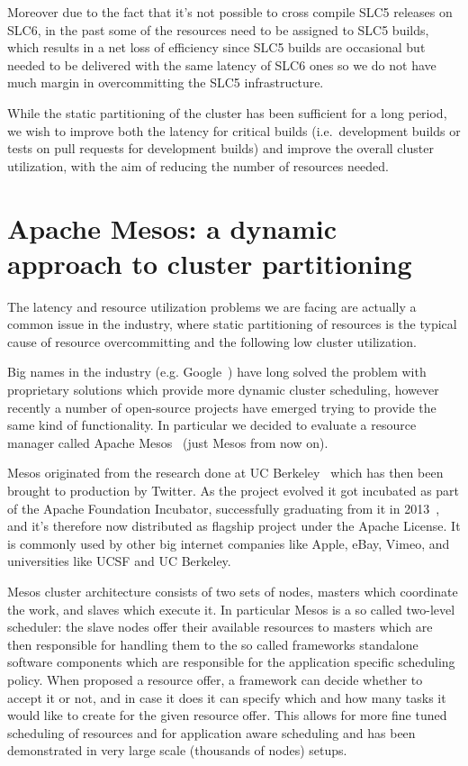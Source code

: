 \documentclass[a4paper]{jpconf}
\begin{document}
Moreover due to the fact that it's not possible to cross compile SLC5 releases
on SLC6, in the past some of the resources need to be assigned to SLC5 builds,
which results in a net loss of efficiency since SLC5 builds are occasional but
needed to be delivered with the same latency of SLC6 ones so we do not have much
margin in overcommitting the SLC5 infrastructure.

While the static partitioning of the cluster has been sufficient for a long
period, we wish to improve both the latency for  critical builds (i.e.\ 
development builds or tests on pull requests for  development builds) and
improve the overall cluster utilization, with the aim  of reducing the number of
resources needed.

\section{Apache Mesos: a dynamic approach to cluster partitioning}

The latency and resource utilization problems we are facing are actually a
common issue in the industry, where static partitioning of resources is the
typical cause of resource overcommitting and the following low cluster
utilization.

Big names in the industry (e.g. Google~\cite{BORG}) have long solved the problem
with proprietary solutions which provide more dynamic cluster scheduling,
however recently a number of open-source projects have emerged trying to provide
the same kind of functionality. In particular we decided to evaluate a resource
manager called Apache Mesos~\cite{MESOS} (just Mesos from now on).

Mesos originated from the research done at UC Berkeley~\cite{MESOSPAPER} which
has then been brought to production by Twitter. As the project evolved it got
incubated as part of the Apache Foundation Incubator, successfully graduating
from it in 2013~\cite{GRADUATION}, and it's therefore now distributed as
flagship project under the Apache License. It is commonly used by other big
internet companies like Apple, eBay, Vimeo, and universities like UCSF and UC
Berkeley.

Mesos cluster architecture consists of two sets of nodes, masters which
coordinate the work, and slaves which execute it. In particular Mesos is a so
called two-level scheduler: the slave nodes offer their available resources to
masters which are then responsible for handling them to the so called frameworks
standalone software components which are responsible for the application
specific scheduling policy. When proposed a resource offer, a framework can
decide whether to accept it or not, and in case it does it can specify which and
how many tasks it would like to create for the given resource offer. This allows
for more fine tuned scheduling of resources and for application aware scheduling
and has been demonstrated in very large scale (thousands of nodes) setups.
\end{document}
